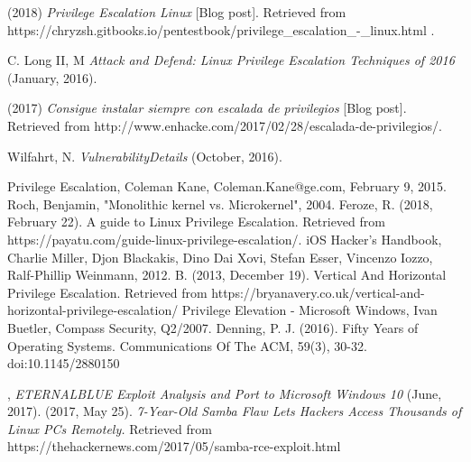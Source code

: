 \documentclass[letterpaper, 10pt, journal]{IEEEtran}
\begin{document}
\begin{thebibliography}{1}
 (2018) \emph{Privilege Escalation Linux} [Blog post]. Retrieved from https://chryzsh.gitbooks.io/pentestbook/privilege\_escalation\_-\_linux.html .

 C. Long II, M \emph{Attack and Defend: Linux Privilege Escalation Techniques of 2016} (January, 2016).

 (2017) \emph{Consigue instalar siempre con escalada de privilegios} [Blog post]. Retrieved from http://www.enhacke.com/2017/02/28/escalada-de-privilegios/.

 Wilfahrt, N. \emph{VulnerabilityDetails} (October, 2016).

\bibitem{[1]} Privilege Escalation, Coleman Kane, Coleman.Kane@ge.com, February 9, 2015.
\bibitem{[2]} Roch, Benjamin, "Monolithic kernel vs. Microkernel", 2004.
\bibitem{[3]} Feroze, R. (2018, February 22). A guide to Linux Privilege Escalation. Retrieved from https://payatu.com/guide-linux-privilege-escalation/.
\bibitem{[4]} iOS Hacker’s Handbook, Charlie Miller, Djon Blackakis, Dino Dai Xovi, Stefan Esser, Vincenzo Iozzo, Ralf-Phillip Weinmann, 2012.
\bibitem{[5]} B. (2013, December 19). Vertical And Horizontal Privilege Escalation. Retrieved from https://bryanavery.co.uk/vertical-and-horizontal-privilege-escalation/ 
\bibitem{[6]} Privilege Elevation - Microsoft Windows, Ivan Buetler, Compass Security, Q2/2007.
Denning, P. J. (2016). Fifty Years of Operating Systems. Communications Of The ACM, 59(3), 30-32. doi:10.1145/2880150

, \emph{ETERNALBLUE Exploit Analysis and Port to Microsoft Windows 10} (June, 2017).
 (2017, May 25). \emph{7-Year-Old Samba Flaw Lets Hackers Access Thousands of Linux PCs Remotely.} Retrieved from https://thehackernews.com/2017/05/samba-rce-exploit.html 


\end{thebibliography}
\end{document}

